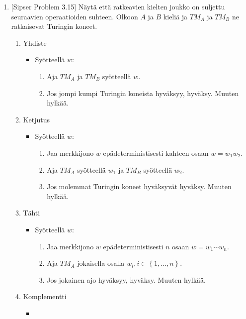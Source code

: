 \documentclass[finnish,11pt,draft]{article}
\newcommand{\set}[1]{{\left\{ #1 \right\}}}
\begin{document}
\begin{enumerate}
\item
  {[Sipser Problem 3.15]} Näytä että ratkeavien kielten joukko on suljettu
  seuraavien operaatioiden suhteen.
%
  Olkoon $A$ ja $B$ kieliä ja $TM_A$ ja $TM_B$ ne ratkaisevat Turingin koneet.
  \begin{enumerate}
  \item Yhdiste
    \begin{itemize}
    \item
      Syötteellä $w$:
      \begin{enumerate}[label=\arabic*.]
      \item
        Aja $TM_A$ ja $TM_B$ syötteellä $w$.
      \item
        Jos jompi kumpi Turingin koneista hyväksyy, hyväksy. Muuten hylkää.
      \end{enumerate}
    \end{itemize}
  \item Ketjutus
    \begin{itemize}
    \item
      Syötteellä $w$:
      \begin{enumerate}[label=\arabic*.]
      \item
        Jaa merkkijono $w$ epädeterministisesti kahteen osaan $w = w_1w_2$.
      \item
        Aja $TM_A$ syötteellä $w_1$ ja $TM_B$ syötteellä $w_2$.
      \item
        Jos molemmat Turingin koneet hyväksyvät hyväksy. Muuten hylkää.
      \end{enumerate}
    \end{itemize}
  \item Tähti
    \begin{itemize}
    \item
      Syötteellä $w$:
      \begin{enumerate}[label=\arabic*.]
      \item
        Jaa merkkijono $w$ epädeterministisesti $n$ osaan $w = w_1 \cdots
        w_n$.
      \item
        Aja $TM_A$ jokaisella osalla $w_i, i \in \set{1, \dots, n}$.
      \item
        Jos jokainen ajo hyväksyy, hyväksy. Muuten hylkää.
      \end{enumerate}
    \end{itemize}
  \item Komplementti
    \begin{itemize}
    \item

\end{itemize}
\end{enumerate}
\end{enumerate}
\end{document}
